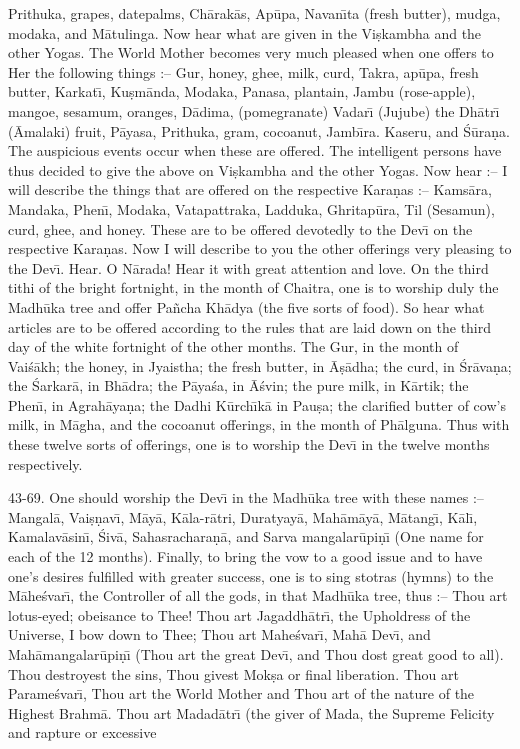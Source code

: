 Prithuka, grapes, datepalms, Ch\=arak\=as, Ap\=upa, Navan\={\i}ta (fresh butter), mudga, modaka, and M\=atulinga. Now hear what are given in the Vi\d{s}kambha and the other Yogas. The World Mother becomes very much pleased when one offers to Her the following things :-- Gur, honey, ghee, milk, curd, Takra, ap\=upa, fresh butter, Karkat\={\i}, Ku\d{s}m\=anda, Modaka, Panasa, plantain, Jambu (rose-apple), mangoe, sesamum, oranges, D\=adima, (pomegranate) Vadar\={\i} (Jujube) the Dh\=atr\={\i} (\=Amalaki) fruit, P\=ayasa, Prithuka, gram, cocoanut, Jamb\={\i}ra. Kaseru, and \'S\=ura\d{n}a. The auspicious events occur when these are offered. The intelligent persons have thus decided to give the above on Vi\d{s}kambha and the other Yogas. Now hear :-- I will describe the things that are offered on the respective Kara\d{n}as :-- Kams\=ara, Mandaka, Phen\={\i}, Modaka, Vatapattraka, Ladduka, Ghritap\=ura, Til (Sesamun), curd, ghee, and honey. These are to be offered devotedly to the Dev\={\i} on the respective Kara\d{n}as. Now I will describe to you the other offerings very pleasing to the Dev\={\i}. Hear. O N\=arada! Hear it with great attention and love. On the third tithi of the bright fortnight, in the month of Chaitra, one is to worship duly the Madh\=uka tree and offer Pa\~ncha Kh\=adya (the five sorts of food). So hear what articles are to be offered according to the rules that are laid down on the third day of the white fortnight of the other months. The Gur, in the month of Vai\'s\=akh; the honey, in Jyaistha; the fresh butter, in \=A\d{s}\=adha; the curd, in \'Sr\=ava\d{n}a; the \'Sarkar\=a, in Bh\=adra; the P\=aya\'sa, in \=A\'svin; the pure milk, in K\=artik; the Phen\={\i}, in Agrah\=aya\d{n}a; the Dadhi K\=urch\={\i}k\=a in Pau\d{s}a; the clarified butter of cow's milk, in M\=agha, and the cocoanut offerings, in the month of Ph\=alguna. Thus with these twelve sorts of offerings, one is to worship the Dev\={\i} in the twelve months respectively.

43-69. One should worship the Dev\={\i} in the Madh\=uka tree with these names :-- Mangal\=a, Vai\d{s}\d{n}av\={\i}, M\=ay\=a, K\=ala-r\=atri, Duratyay\=a, Mah\=am\=ay\=a, M\=atang\={\i}, K\=al\={\i}, Kamalav\=asin\={\i}, \'Siv\=a, Sahasrachara\d{n}\=a, and Sarva mangalar\=upi\d{n}\={\i} (One name for each of the 12 months). Finally, to bring the vow to a good issue and to have one's desires fulfilled with greater success, one is to sing stotras (hymns) to the M\=ahe\'svar\={\i}, the Controller of all the gods, in that Madh\=uka tree, thus :-- Thou art lotus-eyed; obeisance to Thee! Thou art Jagaddh\=atr\={\i}, the Upholdress of the Universe, I bow down to Thee; Thou art Mahe\'svar\={\i}, Mah\=a Dev\={\i}, and Mah\=amangalar\=upi\d{n}\={\i} (Thou art the great Dev\={\i}, and Thou dost great good to all). Thou destroyest the sins, Thou givest Mok\d{s}a or final liberation. Thou art Parame\'svar\={\i}, Thou art the World Mother and Thou art of the nature of the Highest Brahm\=a. Thou art Madad\=atr\={\i} (the giver of Mada, the Supreme Felicity and rapture or excessive

